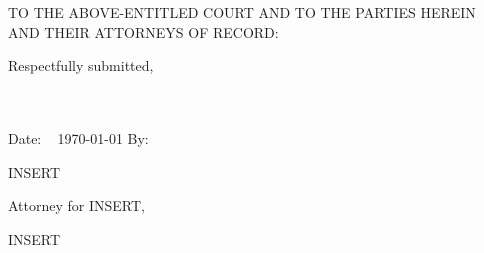 \documentclass{article}
\newcommand{\tab}{\hspace*{.5in}}
\begin{document}
\tab TO THE ABOVE-ENTITLED COURT AND TO THE PARTIES HEREIN AND THEIR ATTORNEYS OF RECORD:


\hspace*{3in}Respectfully submitted,\\

~\\
~\\

\begin{singlespace*}

Date: ~ \today \hspace*{30mm} By: ~ \makebox[3in]{\hrulefill}

\hspace*{3.5in}INSERT

\hspace*{3.5in}Attorney for INSERT,

\hspace*{3.5in}INSERT

\end{singlespace*}
\end{document}
